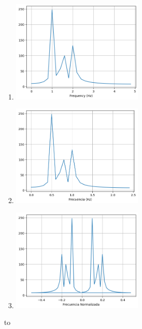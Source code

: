 \documentclass[12pt,a4paper]{article}
\providecommand{\tightlist}{%
  \setlength{\itemsep}{0pt}\setlength{\parskip}{0pt}}\usepackage{longtable,booktabs,array}
\providecommand{\tightlist}{%
  \setlength{\itemsep}{0pt}\setlength{\parskip}{2pt}}
\providecommand{\thisistheend}{\vfill{\hbox to \textwidth{\hfil * * * * * * * * * * * * * * *\hfil}}\vfill}
\begin{document}
\begin{itemize}
\begin{enumerate}
    \begin{enumerate}
    \tightlist
    \item
      \includegraphics[width=0.5\textwidth,height=\textheight]{./figures/output2.png}
    \item
      \includegraphics[width=0.5\textwidth,height=\textheight]{./figures/output3.png}
    \item
      \includegraphics[width=0.5\textwidth,height=\textheight]{./figures/output4.png}
    \end{enumerate}
  \end{enumerate}
\end{itemize}

\thisistheend
\pagebreak
\end{document}

